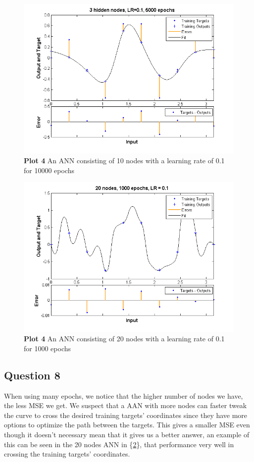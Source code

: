 \documentclass[a4paper]{article}
\begin{document}
\begin{figure}[H] %
	\includegraphics[scale=0.8]{plot4_3nodes.png}
	\caption{\label{fig:plot4_10nodes.png}\textbf{Plot 4} An ANN consisting of 10 nodes with a learning rate of 0.1 for 10000 epochs}
\end{figure}
\begin{figure}[H] %
	\includegraphics[scale=0.8]{plot4_20nodes.png}
	\caption{\label{fig:plot4_20nodes.png}\textbf{Plot 4} An ANN consisting of 20 nodes with a learning rate of 0.1 for 1000 epochs}
\end{figure}

\subsection*{Question 8}
When using many epochs, we notice that the higher number of nodes we have, the less MSE we get. We suspect that a AAN with more nodes can faster tweak the curve to cross the desired training targets' coordinates since they have more options to optimize the path between the targets. This gives a smaller MSE even though it doesn't necessary mean that it gives us a better answer, an example of this can be seen in the 20 nodes ANN in \{\ref{fig:plot4_20nodes.png}\}, that performance very well in crossing the training targets' coordinates.
\end{document}
